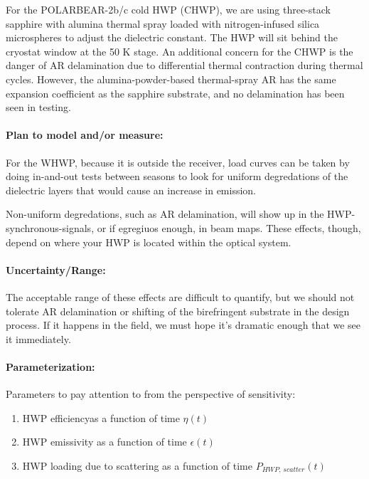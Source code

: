 For the POLARBEAR-2b/c cold HWP (CHWP), we are using three-stack sapphire with alumina thermal spray loaded with nitrogen-infused silica microspheres to adjust the dielectric constant. The HWP will sit behind the cryostat window at the 50 K stage. An additional concern for the CHWP is the danger of AR delamination due to differential thermal contraction during thermal cycles. However, the alumina-powder-based thermal-spray AR has the same expansion coefficient as the sapphire substrate, and no delamination has been seen in testing.
  
\paragraph{Plan to model and/or measure:}

For the WHWP, because it is outside the receiver, load curves can be taken by doing in-and-out tests between seasons to look for uniform degredations of the dielectric layers that would cause an increase in emission. 

Non-uniform degredations, such as AR delamination, will show up in the HWP-synchronous-signals, or if egregiuos enough, in beam maps. These effects, though, depend on where your HWP is located within the optical system.

\paragraph{Uncertainty/Range:}

The acceptable range of these effects are difficult to quantify, but we should not tolerate AR delamination or shifting of the birefringent substrate in the design process. If it happens in the field, we must hope it's dramatic enough that we see it immediately.

\paragraph{Parameterization:}

Parameters to pay attention to from the perspective of sensitivity:

\begin{enumerate}
	\item HWP efficiencyas a function of time $\eta(t)$
	\item HWP emissivity as a function of time $\epsilon(t)$
	\item HWP loading due to scattering as a function of time $P_{HWP, \, scatter}(t)$
\end{enumerate}	
